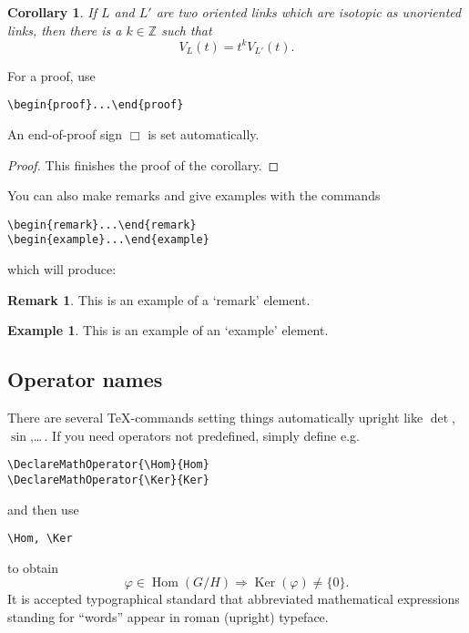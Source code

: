 \documentclass{RSMUP}
\newtheorem*{coro}{Corollary} %
\theoremstyle{definition}
\newtheorem{example}[theorem]{Example}
\newtheorem{remark}[theorem]{Remark}
\DeclareMathOperator{\Hom}{Hom}
\DeclareMathOperator{\Ker}{Ker}
\begin{document}
\begin{coro}
If $L$ and $L'$ are two oriented links which are isotopic as unoriented links,
then there is a $k\in \mathbb{Z}$ such that
\[
V_L(t)= t^k V_{L'}(t).
\]
\end{coro}

For a proof, use

\begin{verbatim}
\begin{proof}...\end{proof}
\end{verbatim}

An end-of-proof sign $\Box$ is set automatically.

\begin{proof}
This finishes the proof of the corollary.
\end{proof}

You can also make remarks and give examples with the commands
\begin{verbatim}
\begin{remark}...\end{remark}
\begin{example}...\end{example}
\end{verbatim}
which will produce:

\begin{remark}
This is an example of a `remark' element.
\end{remark}

\begin{example}
This is an example of an `example' element.
\end{example}


\subsection{Operator names}

There are several \TeX-commands setting things automatically upright like $\det$, $\sin$,\dots\,.
If you need operators not predefined, simply define e.g.
\begin{verbatim}
\DeclareMathOperator{\Hom}{Hom}
\DeclareMathOperator{\Ker}{Ker}
\end{verbatim}
and then use
\begin{verbatim}
\Hom, \Ker
\end{verbatim}
to obtain
$$
\varphi \in \Hom(G/H) \Longrightarrow \Ker(\varphi) \not= \{0\}.
$$
It is accepted typographical standard that abbreviated mathematical expressions standing for ``words''
appear in roman (upright) typeface.
\end{document}

